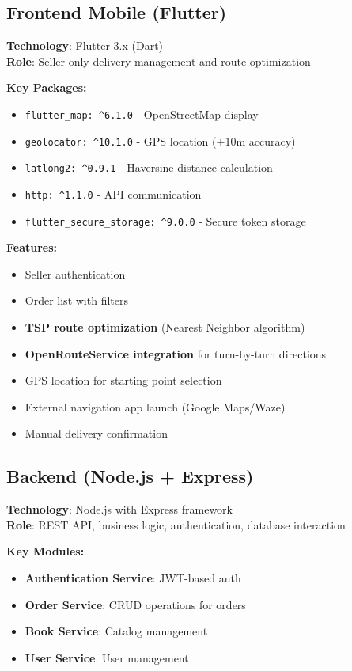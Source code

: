 \documentclass[12pt,a4paper]{article}
\begin{document}
\subsection{Frontend Mobile (Flutter)}

\textbf{Technology}: Flutter 3.x (Dart)\\
\textbf{Role}: Seller-only delivery management and route optimization

\textbf{Key Packages:}
\begin{itemize}
    \item \texttt{flutter\_map: \^{}6.1.0} - OpenStreetMap display
    \item \texttt{geolocator: \^{}10.1.0} - GPS location ($\pm$10m accuracy)
    \item \texttt{latlong2: \^{}0.9.1} - Haversine distance calculation
    \item \texttt{http: \^{}1.1.0} - API communication
    \item \texttt{flutter\_secure\_storage: \^{}9.0.0} - Secure token storage
\end{itemize}

\textbf{Features:}
\begin{itemize}
    \item Seller authentication
    \item Order list with filters
    \item \textbf{TSP route optimization} (Nearest Neighbor algorithm)
    \item \textbf{OpenRouteService integration} for turn-by-turn directions
    \item GPS location for starting point selection
    \item External navigation app launch (Google Maps/Waze)
    \item Manual delivery confirmation
\end{itemize}

\subsection{Backend (Node.js + Express)}

\textbf{Technology}: Node.js with Express framework\\
\textbf{Role}: REST API, business logic, authentication, database interaction

\textbf{Key Modules:}
\begin{itemize}
    \item \textbf{Authentication Service}: JWT-based auth
    \item \textbf{Order Service}: CRUD operations for orders
    \item \textbf{Book Service}: Catalog management
    \item \textbf{User Service}: User management
\end{itemize}
\end{document}
